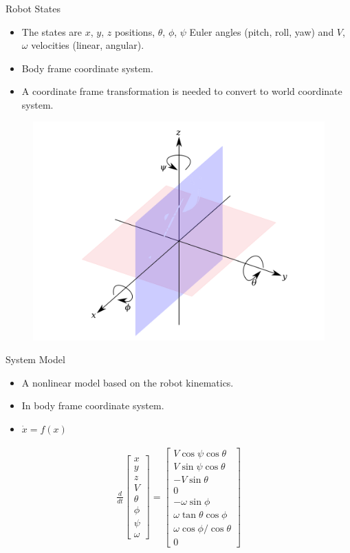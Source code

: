\documentclass[hyperref={pdfpagelabels=false}]{beamer}
\begin{document}
\begin{frame}{Robot States}
\begin{itemize}
\item The states are $x$, $y$, $z$ positions, $\theta$, $\phi$, $\psi$ Euler angles (pitch, roll, yaw) and $V$, $\omega$ velocities (linear, angular).
\item Body frame coordinate system.
\item A coordinate frame transformation is needed to convert to world coordinate system.
\end{itemize}
\begin{figure}[ht!]
    \centering
    \includegraphics[width=.5\textwidth]{images/packbotaxes}
\end{figure}
\end{frame}

\begin{frame}{System Model}
\begin{itemize}
\item A nonlinear model based on the robot kinematics.
\item In body frame coordinate system.
\item $\dot{x} = f(x)$
\end{itemize}
\begin{align*}
\frac{d}{dt}\left[\begin{array}{c}
x \\ y \\ z \\ V \\ \theta \\ \phi \\ \psi \\ \omega
\end{array}\right] =
\left[\begin{array}{c}
V\cos\psi\cos\theta \\
V\sin\psi\cos\theta \\
-V\sin\theta \\
0 \\
-\omega\sin\phi \\
\omega\tan\theta\cos\phi \\
\omega\cos\phi/\cos\theta \\
0
\end{array}\right]
\end{align*}
\end{frame}
\end{document}
